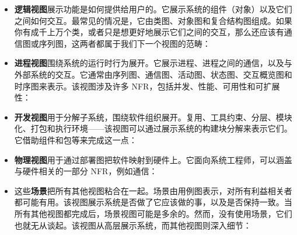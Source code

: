 \begin{itemize}
\label{idx:192}
\label{idx:193}
\item \textbf{逻辑视图}展示功能是如何提供给用户的。它展示系统的组件（对象）以及它们之间如何交互。最常见的情况是，它由类图、对象图和复合结构图组成。如果你有成千上万个类，或者只是想更好地展示它们之间的交互，那么还应该有通信图或序列图，这两者都属于我们下一个视图的范畴：
\end{itemize}


\begin{itemize}
\label{idx:194}
\label{idx:195}
\item \textbf{进程视图}围绕系统的运行时行为展开。它展示进程、进程之间的通信，以及与外部系统的交互。它通常由序列图、通信图、活动图、状态图、交互概览图和时序图来表示。该视图涉及许多 NFR，包括并发、性能、可用性和可扩展性：
\end{itemize}


\begin{itemize}
\label{idx:196}
\label{idx:197}
\item \textbf{开发视图}用于分解子系统，围绕软件组织展开。复用、工具约束、分层、模块化、打包和执行环境——该视图可以通过展示系统的构建块分解来表示它们。它借助组件和包等来完成这一点：
\end{itemize}


\begin{itemize}
\label{idx:198}
\label{idx:199}
\item \textbf{物理视图}用于通过部署图把软件映射到硬件上。它面向系统工程师，可以涵盖与硬件相关的一部分 NFR，例如通信：
\end{itemize}


\begin{itemize}
\label{idx:200}
\label{idx:201}
\item 这些\textbf{场景}把所有其他视图粘合在一起。场景由用例图表示，对所有利益相关者都可能有用。该视图展示系统是否做了它应该做的事，以及是否保持一致。当所有其他视图都完成后，场景视图可能是多余的。然而，没有使用场景，它们也就无从谈起。该视图从高层展示系统，而其他视图则深入细节：
\end{itemize}

